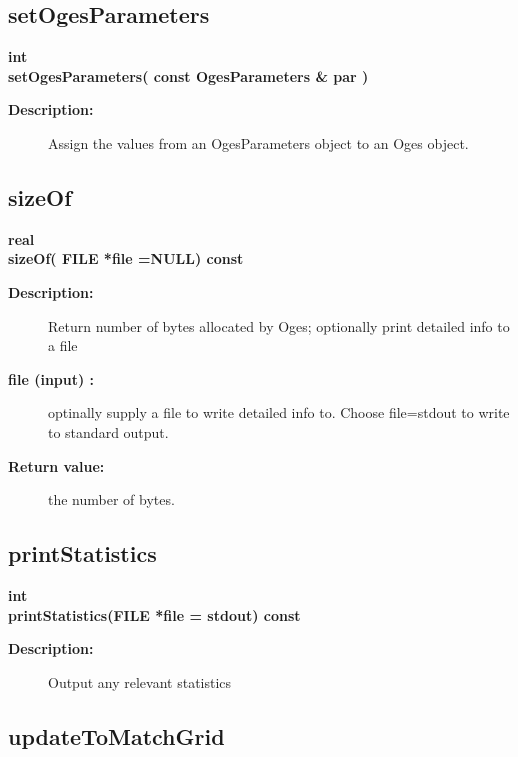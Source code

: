 \subsection{setOgesParameters}
 
\begin{flushleft} \textbf{%
int  \\ 
\settowidth{\OgesIncludeArgIndent}{setOgesParameters(}%
setOgesParameters( const OgesParameters \& par )
}\end{flushleft}
\begin{description}
\item[{\bf Description:}] 
    Assign the values from an OgesParameters object to an Oges object.
\end{description}
\subsection{sizeOf}
 
\begin{flushleft} \textbf{%
real   \\ 
\settowidth{\OgesIncludeArgIndent}{sizeOf(}%
sizeOf( FILE *file  =NULL) const 
}\end{flushleft}
\begin{description}
\item[{\bf Description:}]  
   Return number of bytes allocated by Oges; optionally print detailed info to a file

\item[{\bf file (input) :}]  optinally supply a file to write detailed info to. Choose file=stdout to
 write to standard output.
\item[{\bf Return value:}]  the number of bytes.
\end{description}
\subsection{printStatistics}
 
\begin{flushleft} \textbf{%
int  \\ 
\settowidth{\OgesIncludeArgIndent}{printStatistics(}%
printStatistics(FILE *file  = stdout) const
}\end{flushleft}
\begin{description}
\item[{\bf Description:}] 
   Output any relevant statistics
\end{description}
\subsection{updateToMatchGrid}
 
